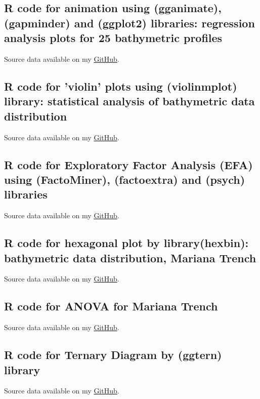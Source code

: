 \documentclass[11pt,a4paper]{report}
\begin{document}
{\begin{appendices}
\subsection{R code for animation using (gganimate), (gapminder) and (ggplot2) libraries: regression analysis plots for 25 bathymetric profiles}\label{R:24}
Source data available on my \href{https://github.com/paulinelemenkova/24-R-Animation}{GitHub}.

\pagebreak

\subsection{R code for 'violin' plots using (violinmplot) library: statistical analysis of bathymetric data distribution}\label{R:25}
Source data available on my \href{https://github.com/paulinelemenkova/25-R-Violinplot}{GitHub}.

\pagebreak

\subsection{R code for Exploratory Factor Analysis (EFA) using (FactoMiner), (factoextra) and (psych) libraries}\label{R:26}
Source data available on my \href{https://github.com/paulinelemenkova/26-R-Factor-Analysis}{GitHub}.

\pagebreak

\subsection{R code for hexagonal plot by library(hexbin): bathymetric data distribution, Mariana Trench}\label{R:27}
Source data available on my \href{https://github.com/paulinelemenkova/27-R-Hexagonal-Hexbin-plot}{GitHub}.

\pagebreak

\subsection{R code for \ac{ANOVA} for Mariana Trench}\label{R:28}
Source data available on my \href{https://github.com/paulinelemenkova/28-R-ANOVA}{GitHub}.

\pagebreak

\subsection{R code for Ternary Diagram by (ggtern) library}\label{R:29}
Source data available on my \href{https://github.com/paulinelemenkova/29-R-Ternary}{GitHub}.

\pagebreak


\end{appendices}}
\end{document}
